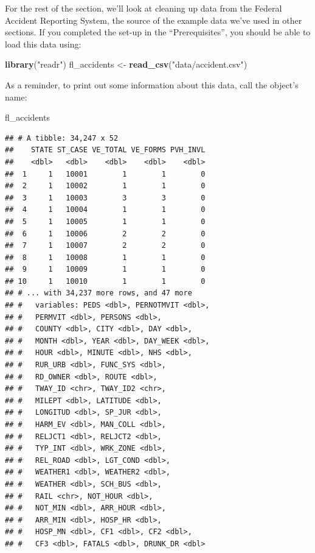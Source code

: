 \documentclass[]{tufte-book}
\newenvironment{Shaded}{}{}
\newcommand{\KeywordTok}[1]{\textcolor[rgb]{0.00,0.44,0.13}{\textbf{#1}}}
\newcommand{\NormalTok}[1]{#1}
\newcommand{\StringTok}[1]{\textcolor[rgb]{0.25,0.44,0.63}{#1}}
\begin{document}
For the rest of the section, we'll look at cleaning up data from the Federal Accident
Reporting System, the source of the example data we've used in other sections.
If you completed the set-up in the ``Prerequisites'', you should be able to load this
data using:

\begin{Shaded}
\begin{Highlighting}[]
\KeywordTok{library}\NormalTok{(}\StringTok{"readr"}\NormalTok{)}
\NormalTok{fl_accidents <-}\StringTok{ }\KeywordTok{read_csv}\NormalTok{(}\StringTok{"data/accident.csv"}\NormalTok{)}
\end{Highlighting}
\end{Shaded}

As a reminder, to print out some information about this data, call the object's name:

\begin{Shaded}
\begin{Highlighting}[]
\NormalTok{fl_accidents}
\end{Highlighting}
\end{Shaded}

\begin{verbatim}
## # A tibble: 34,247 x 52
##    STATE ST_CASE VE_TOTAL VE_FORMS PVH_INVL
##    <dbl>   <dbl>    <dbl>    <dbl>    <dbl>
##  1     1   10001        1        1        0
##  2     1   10002        1        1        0
##  3     1   10003        3        3        0
##  4     1   10004        1        1        0
##  5     1   10005        1        1        0
##  6     1   10006        2        2        0
##  7     1   10007        2        2        0
##  8     1   10008        1        1        0
##  9     1   10009        1        1        0
## 10     1   10010        1        1        0
## # ... with 34,237 more rows, and 47 more
## #   variables: PEDS <dbl>, PERNOTMVIT <dbl>,
## #   PERMVIT <dbl>, PERSONS <dbl>,
## #   COUNTY <dbl>, CITY <dbl>, DAY <dbl>,
## #   MONTH <dbl>, YEAR <dbl>, DAY_WEEK <dbl>,
## #   HOUR <dbl>, MINUTE <dbl>, NHS <dbl>,
## #   RUR_URB <dbl>, FUNC_SYS <dbl>,
## #   RD_OWNER <dbl>, ROUTE <dbl>,
## #   TWAY_ID <chr>, TWAY_ID2 <chr>,
## #   MILEPT <dbl>, LATITUDE <dbl>,
## #   LONGITUD <dbl>, SP_JUR <dbl>,
## #   HARM_EV <dbl>, MAN_COLL <dbl>,
## #   RELJCT1 <dbl>, RELJCT2 <dbl>,
## #   TYP_INT <dbl>, WRK_ZONE <dbl>,
## #   REL_ROAD <dbl>, LGT_COND <dbl>,
## #   WEATHER1 <dbl>, WEATHER2 <dbl>,
## #   WEATHER <dbl>, SCH_BUS <dbl>,
## #   RAIL <chr>, NOT_HOUR <dbl>,
## #   NOT_MIN <dbl>, ARR_HOUR <dbl>,
## #   ARR_MIN <dbl>, HOSP_HR <dbl>,
## #   HOSP_MN <dbl>, CF1 <dbl>, CF2 <dbl>,
## #   CF3 <dbl>, FATALS <dbl>, DRUNK_DR <dbl>
\end{verbatim}
\end{document}

